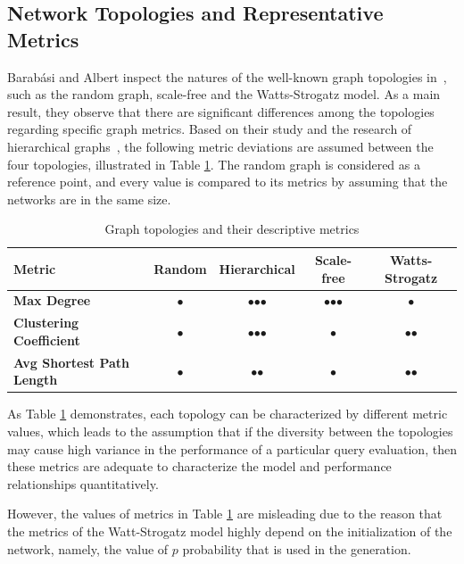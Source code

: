 \subsection{Network Topologies and Representative Metrics}

Barabási and Albert inspect the natures of the well-known graph topologies in~\cite{statistical_mechanics}, such as the random graph, scale-free and the Watts-Strogatz model. As a main result, they observe that there are significant differences among the topologies regarding specific graph metrics. Based on their study and the research of hierarchical graphs~\cite{hierarchical}, the following metric deviations are assumed between the four topologies, illustrated in Table \ref{tab:topology_metrics}. The random graph is considered as a reference point, and every value is compared to its metrics by assuming that the networks are in the same size.
\begin{table}[ht]
	\footnotesize
	\centering
	\begin{tabular}{ l c c c c}
		\toprule
		Metric & Random & Hierarchical & Scale-free & Watts-Strogatz \\ 
		\midrule 
		\textbf{Max Degree} & $\bullet$ & $\bullet$$\bullet$$\bullet$ & $\bullet$$\bullet$$\bullet$ & $\bullet$ \\ \hline
		\textbf{Clustering Coefficient} & $\bullet$ & $\bullet$$\bullet$$\bullet$ & $\bullet$ & $\bullet$$\bullet $\\ \hline
		\textbf{Avg Shortest Path Length} & $\bullet$ & $\bullet$$\bullet$ & $\bullet$ & $\bullet$$\bullet$ \\ \hline
		\bottomrule
	\end{tabular}
	\caption{Graph topologies and their descriptive metrics}
	\label{tab:topology_metrics}
\end{table}
As Table \ref{tab:topology_metrics} demonstrates, each topology can be characterized by different metric values, which leads to the assumption that if the diversity between the topologies may cause high variance in the performance of a particular query evaluation, then these metrics are adequate to characterize the model and performance relationships quantitatively.


However, the values of metrics in Table \ref{tab:topology_metrics} are misleading due to the reason that the metrics of the Watt-Strogatz model highly depend on the initialization of the network, namely, the value of $p$ probability that is used in the generation.

